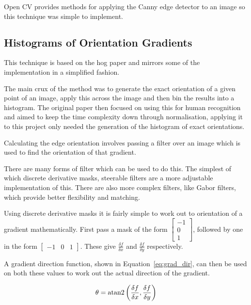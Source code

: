 Open CV provides methods for applying the Canny edge detector to an image so this technique was 
simple to implement.


\subsection{Histograms of Orientation Gradients}
This technique is based on the \gls{hog} paper\cite{Dalal2005Histograms} and mirrors some of the
implementation in a simplified fashion.

The main crux of the method was to generate the exact orientation of a given point of an image,
apply this across the image and then bin the results into a histogram. The original paper then
focused on using this for human recognition and aimed to keep the time complexity down through
normalisation, applying it to this project only needed the generation of the histogram of exact
orientations.

Calculating the edge orientation involves passing a filter over an image which is used to find the
orientation of that gradient. 

There are many forms of filter which can be used to do this. The simplest of which discrete 
derivative masks, steerable filters 
are a more adjustable implementation of this. There are also more complex filters, like Gabor 
filters, which provide better flexibility and matching.

Using discrete derivative masks it is fairly simple to work out to orientation of a gradient 
mathematically. First pass a mask of the form $\left[\begin{smallmatrix}-1\\0\\1\end{smallmatrix}\right]$, followed
by one in the form $\left[\begin{smallmatrix}-1 & 0 & 1\end{smallmatrix}\right]$. These give 
$\frac{\delta f}{\delta x}$ and $\frac{\delta f}{\delta y}$ respectively.

A gradient direction function, shown in Equation~\ref{eq:grad_dir}, can then be used on both these
values to work out the actual direction of the gradient.

\begin{equation} \label{eq:grad_dir}
\theta = {\rm atan2}\left( \frac{\delta f}{\delta x}, \frac{\delta f}{\delta y} \right)
\end{equation}

